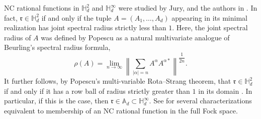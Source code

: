 \documentclass{article}
\theoremstyle{definition}
\theoremstyle{remark}
\numberwithin{equation}{section}
\def\fr{\mathfrak{r}}
\def\bH{\mathbb{H}}
\def\A{\mathbb{A} _d}
\def\mult{\mathbb{H} ^\infty _d}
\begin{document}
NC rational functions in $\bH^2_d$ and $\bH^{\infty}_d$ were studied by Jury, and the authors in \cite{JMS-NCrat}. In fact, $\fr \in \bH^2_d$ if and only if the tuple $A = (A_1,\ldots,A_d)$ appearing in its minimal realization has joint spectral radius strictly less than $1$. Here, the joint spectral radius of $A$ was defined by Popescu \cite{PopRota} as a natural multivariate analogue of Beurling's spectral radius formula,
\[
\rho(A) = \lim_{n\to\infty} \left\|\sum_{|\alpha| = n} A^{\alpha} A^{\alpha *}\right\|^{\dfrac{1}{2n}}.
\]
It further follows, by Popescu's multi-variable Rota--Strang theorem, that $\fr \in \bH^2_d$ if and only if it has a row ball of radius strictly greater than $1$ in its domain \cite{PopRota}. In particular, if this is the case, then $\fr \in \A \subset \mult$. See \cite[Theorem A]{JMS-NCrat} for several characterizations equivalent to membership of an NC rational function in the full Fock space.
\end{document}
